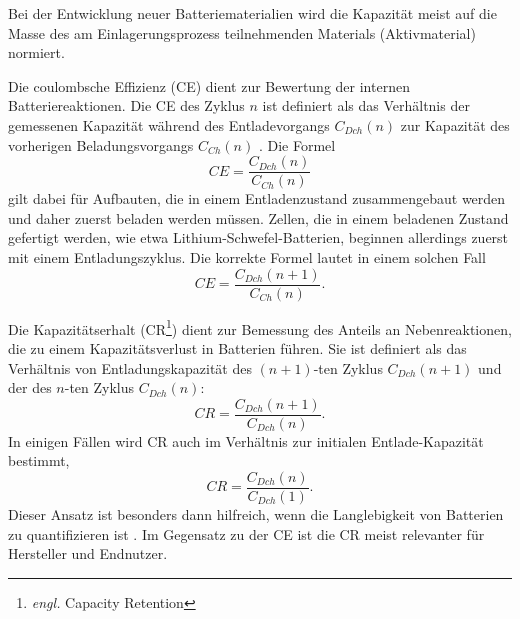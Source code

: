Bei der Entwicklung neuer Batteriematerialien wird die Kapazität meist auf die Masse des am Einlagerungsprozess teilnehmenden Materials (Aktivmaterial) normiert. %


Die coulombsche Effizienz (CE) dient zur Bewertung der internen Batteriereaktionen. Die CE des Zyklus \( n \) ist definiert als das Verhältnis der gemessenen Kapazität während des Entladevorgangs \( C_{Dch}(n) \) zur Kapazität des vorherigen Beladungsvorgangs \( C_{Ch}(n) \) \cite{Tornheim2020}.
Die Formel
\begin{equation}
CE = \frac{C_{Dch}(n)}{C_{Ch}(n)}
\end{equation}
gilt dabei für Aufbauten, die in einem Entladenzustand zusammengebaut werden und daher zuerst beladen werden müssen. Zellen, die in einem beladenen Zustand gefertigt werden, wie etwa Lithium-Schwefel-Batterien, beginnen allerdings zuerst mit einem Entladungszyklus. Die korrekte Formel lautet in einem solchen Fall
\begin{equation}
    CE = \frac{C_{Dch}(n+1)}{C_{Ch}(n)}.
\end{equation}

Die Kapazitätserhalt (CR\footnote{\textit{engl.} Capacity Retention}) dient zur Bemessung des Anteils an Nebenreaktionen, die zu einem Kapazitätsverlust in Batterien führen. Sie ist definiert als das Verhältnis von Entladungskapazität des $(n+1)$-ten Zyklus $C_{Dch}(n+1)$ und der des $n$-ten Zyklus $C_{Dch}(n)$:
\begin{equation}
    CR = \frac{C_{Dch}(n+1)}{C_{Dch}(n)}.
\end{equation}
In einigen Fällen wird CR auch im Verhältnis zur initialen Entlade-Kapazität bestimmt,
\begin{equation}
    CR = \frac{C_{Dch}(n)}{C_{Dch}(1)}.
\end{equation}
Dieser Ansatz ist besonders dann hilfreich, wenn die Langlebigkeit von Batterien zu quantifizieren ist \cite{Tornheim2020}.
Im Gegensatz zu der CE ist die CR meist relevanter für Hersteller und Endnutzer.

